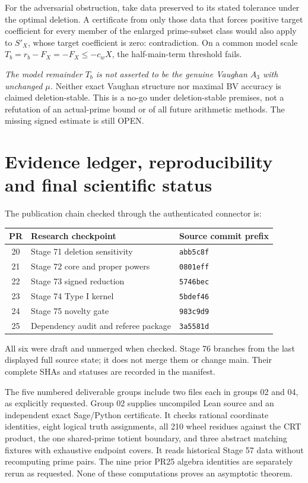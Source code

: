 \documentclass[11pt,a4paper]{article}
\begin{document}
For the adversarial obstruction, take data preserved to its stated tolerance under the optimal deletion. A certificate from only those data that forces positive target coefficient for every member of the enlarged prime-subset class would also apply to $S'_X$, whose target coefficient is zero: contradiction. On a common model scale $T_b=r_b-F_X=-F_X\le-c_wX$, the half-main-term threshold fails.

\emph{The model remainder $T_b$ is not asserted to be the genuine Vaughan $A_3$ with unchanged $\mu$.} Neither exact Vaughan structure nor maximal BV accuracy is claimed deletion-stable. This is a no-go under deletion-stable premises, not a refutation of an actual-prime bound or of all future arithmetic methods. The missing signed estimate is still OPEN.
\newpage
\section{Evidence ledger, reproducibility and final scientific status}
The publication chain checked through the authenticated connector is:
\begin{center}\begin{tabular}{cll}\toprule
PR & Research checkpoint & Source commit prefix\\\midrule
20 & Stage 71 deletion sensitivity & \texttt{abb5c8f}\\
21 & Stage 72 core and proper powers & \texttt{0801eff}\\
22 & Stage 73 signed reduction & \texttt{5746bec}\\
23 & Stage 74 Type I kernel & \texttt{5bdef46}\\
24 & Stage 75 novelty gate & \texttt{983c9d9}\\
25 & Dependency audit and referee package & \texttt{3a5581d}\\\bottomrule
\end{tabular}\end{center}
All six were draft and unmerged when checked. Stage 76 branches from the last displayed full source state; it does not merge them or change main. Their complete SHAs and statuses are recorded in the manifest.

The five numbered deliverable groups include two files each in groups 02 and 04, as explicitly requested. Group 02 supplies uncompiled Lean source and an independent exact Sage/Python certificate. It checks rational coordinate identities, eight logical truth assignments, all 210 wheel residues against the CRT product, the one shared-prime totient boundary, and three abstract matching fixtures with exhaustive endpoint covers. It reads historical Stage 57 data without recomputing prime pairs. The nine prior PR25 algebra identities are separately rerun as requested. None of these computations proves an asymptotic theorem.
\end{document}
